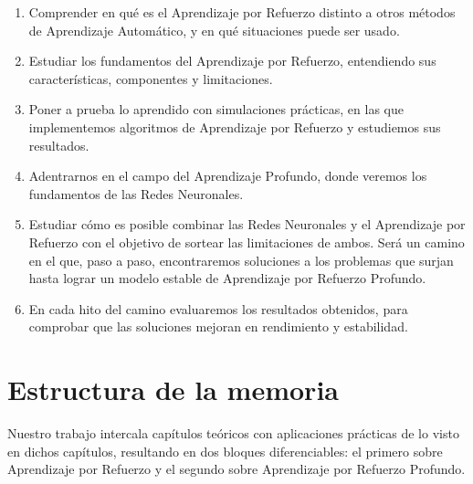 \begin{enumerate}
    \item Comprender en qué es el Aprendizaje por Refuerzo distinto a otros métodos de Aprendizaje Automático, y en qué situaciones puede ser usado.
    \item Estudiar los fundamentos del Aprendizaje por Refuerzo, entendiendo sus características, componentes y limitaciones.
    \item Poner a prueba lo aprendido con simulaciones prácticas, en las que implementemos algoritmos de Aprendizaje por Refuerzo y estudiemos sus resultados.
    \item Adentrarnos en el campo del Aprendizaje Profundo, donde veremos los fundamentos de las Redes Neuronales.
    \item Estudiar cómo es posible combinar las Redes Neuronales y el Aprendizaje por Refuerzo con el objetivo de sortear las limitaciones de ambos. Será un camino en el que, paso a paso, encontraremos soluciones a los problemas que surjan hasta lograr un modelo estable de Aprendizaje por Refuerzo Profundo.
    \item En cada hito del camino evaluaremos los resultados obtenidos, para comprobar que las soluciones mejoran en rendimiento y estabilidad.
\end{enumerate}


\section{Estructura de la memoria}

Nuestro trabajo intercala capítulos teóricos con aplicaciones prácticas de lo visto en dichos capítulos, resultando en dos bloques diferenciables: el primero sobre Aprendizaje por Refuerzo y el segundo sobre Aprendizaje por Refuerzo Profundo.

